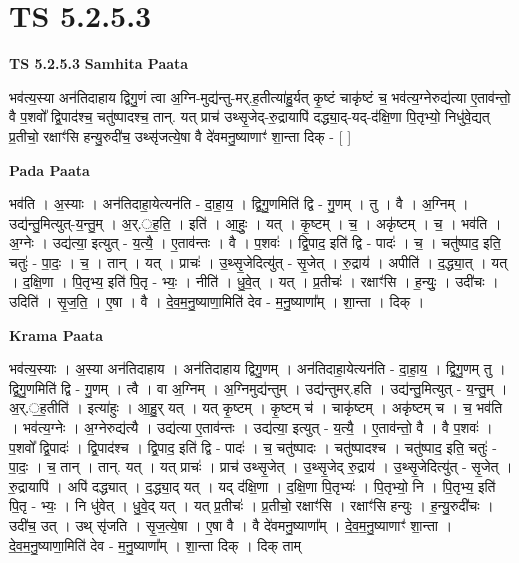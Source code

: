 \documentclass[17pt]{extarticle}
\begin{document}
\section{ TS 5.2.5.3 }

\textbf{TS 5.2.5.3 } \newline
\textbf{Samhita Paata} \newline

भव॑त्य॒स्या अन॑तिदाहाय द्विगु॒णं त्वा अ॒ग्नि-मुद्य॑न्तु-मर्.ह॒तीत्या॑हु॒र्यत् कृ॒ष्टं चाकृ॑ष्टं च॒ भव॑त्य॒ग्नेरुद्य॑त्या ए॒ताव॑न्तो॒ वै प॒शवो᳚ द्वि॒पाद॑श्च॒ चतु॑ष्पादश्च॒ तान्. यत् प्राच॑ उथ्सृ॒जेद्-रु॒द्रायापि॑ दद्ध्या॒द्-यद्-द॑क्षि॒णा पि॒तृभ्यो॒ निधु॑वे॒द्यत् प्र॒तीचो॒ रक्षाꣳ॑सि हन्यु॒रुदी॑च॒ उथ्सृ॑जत्ये॒षा वै दे॑वमनु॒ष्याणाꣳ॑ शा॒न्ता दिक् - [  ] \newline

\textbf{Pada Paata} \newline

भव॑ति । अ॒स्याः । अन॑तिदाहा॒येत्यन॑ति - दा॒हा॒य॒ । द्वि॒गु॒णमिति॑ द्वि - गु॒णम् । तु । वै । अ॒ग्निम् । उद्य॑न्तु॒मित्युत्-य॒न्तु॒म् । अ॒र्.॒ह॒ति॒ । इति॑ । आ॒हुः॒ । यत् । कृ॒ष्टम् । च॒ । अकृ॑ष्टम् । च॒ । भव॑ति । अ॒ग्नेः । उद्य॑त्या॒ इत्युत् - य॒त्यै॒ । ए॒ताव॑न्तः । वै । प॒शवः॑ । द्वि॒पाद॒ इति॑ द्वि - पादः॑ । च॒ । चतु॑ष्पाद॒ इति॒ चतुः॑ - पा॒दः॒ । च॒ । तान् । यत् । प्राचः॑ । उ॒थ्सृ॒जेदित्यु॑त् - सृ॒जेत् । रु॒द्राय॑ । अपीति॑ । द॒द्ध्या॒त् । यत् । द॒क्षि॒णा । पि॒तृभ्य॒ इति॑ पि॒तृ - भ्यः॒ । नीति॑ । धु॒वे॒त् । यत् । प्र॒तीचः॑ । रक्षाꣳ॑सि । ह॒न्युः॒ । उदी॑चः । उदिति॑ । सृ॒ज॒ति॒ । ए॒षा । वै । दे॒व॒म॒नु॒ष्याणा॒मिति॑ देव - म॒नु॒ष्याणा᳚म् । शा॒न्ता । दिक् ।  \newline


\textbf{Krama Paata} \newline

भव॑त्य॒स्याः । अ॒स्या अन॑तिदाहाय । अन॑तिदाहाय द्विगु॒णम् । अन॑तिदाहा॒येत्यन॑ति - दा॒हा॒य॒ । द्वि॒गु॒णम् तु । द्वि॒गु॒णमिति॑ द्वि - गु॒णम् । त्वै । वा अ॒ग्निम् । अ॒ग्निमुद्य॑न्तुम् । उद्य॑न्तुमर्.हति । उद्य॑न्तु॒मित्युत् - य॒न्तु॒म् । अ॒र्.॒ह॒तीति॑ । इत्या॑हुः । आ॒हु॒र् यत् । यत् कृ॒ष्टम् । कृ॒ष्टम् च॑ । चाकृ॑ष्टम् । अकृ॑ष्टम् च । च॒ भव॑ति । भव॑त्य॒ग्नेः । अ॒ग्नेरुद्य॑त्यै । उद्य॑त्या ए॒ताव॑न्तः । उद्य॑त्या॒ इत्युत् - य॒त्यै॒ । ए॒ताव॑न्तो॒ वै । वै प॒शवः॑ । प॒शवो᳚ द्वि॒पादः॑ । द्वि॒पाद॑श्च । द्वि॒पाद॒ इति॑ द्वि - पादः॑ । च॒ चतु॑ष्पादः । चतु॑ष्पादश्च । चतु॑ष्पाद॒ इति॒ चतुः॑ - पा॒दः॒ । च॒ तान् । तान्. यत् । यत् प्राचः॑ । प्राच॑ उथ्सृ॒जेत् । उ॒थ्सृ॒जेद् रु॒द्राय॑ । उ॒थ्सृ॒जेदित्यु॑त् - सृ॒जेत् । रु॒द्रायापि॑ । अपि॑ दद्ध्यात् । द॒द्ध्या॒द् यत् । यद् द॑क्षि॒णा । द॒क्षि॒णा पि॒तृभ्यः॑ । पि॒तृभ्यो॒ नि । पि॒तृभ्य॒ इति॑ पि॒तृ - भ्यः॒ । नि धु॑वेत् । धु॒वे॒द् यत् । यत् प्र॒तीचः॑ । प्र॒तीचो॒ रक्षाꣳ॑सि । रक्षाꣳ॑सि हन्युः । ह॒न्यु॒रुदी॑चः । उदी॑च॒ उत् । उथ् सृ॑जति । सृ॒ज॒त्ये॒षा । ए॒षा वै । वै दे॑वमनु॒ष्याणा᳚म् । दे॒व॒म॒नु॒ष्याणाꣳ॑ शा॒न्ता । दे॒व॒म॒नु॒ष्याणा॒मिति॑ देव - म॒नु॒ष्याणा᳚म् । शा॒न्ता दिक् । दिक् ताम् \newline
\end{document}

